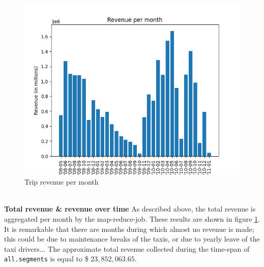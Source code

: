 \documentclass[11pt]{article}
\begin{document}
\begin{figure}
	\includegraphics[width=1.2\linewidth]{./img/revenuePerMonth.png}
	\caption{Trip revenue per month}
	\label{fig:revenue}
\end{figure}

\noindent\\\textbf{Total revenue \& revenue over time}
As described above, the total revenue is aggregated per month by the map-reduce-job. These results are shown in figure \ref{fig:revenue}. It is remarkable that there are months during which almost no revenue is made; this could be due to maintenance breaks of the taxis, or due to yearly leave of the taxi drivers... The approximate total revenue collected during the time-span of \texttt{all.segments} is equal to \$ $23,852,063.65$.

\vspace{-.2cm}


\end{document}
